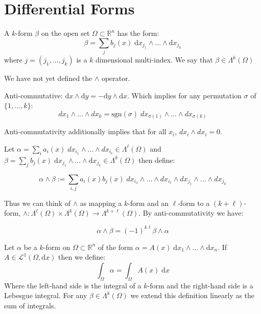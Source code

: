 \section{Differential Forms}

\begin{definition}
A $k$-form $\beta$ on the open set $\Omega \subset \mathbb{R}^n$ has the form:
\begin{equation}
\beta = \sum_j b_j(x) \; \text{d} x_{j_1} \wedge ... \wedge \text{d} x_{j_k}
\end{equation}
where $j=(j_1, ..., j_k)$ is a $k$ dimensional multi-index. We say that $\beta \in \Lambda^k(\Omega)$
\end{definition}

We have not yet defined the $\wedge$ operator.

Anti-commutative: $\text{d} x \wedge \text{d} y = - \text{d}y \wedge \text{d} x$. 
Which implies for any permutation $\sigma$ of $\{1,...,k\}$:
\begin{equation}
dx_1 \wedge ... \wedge dx_k = \text{sgn}(\sigma) \; dx_{\sigma(1)} \wedge ... \wedge dx_{\sigma(k)}
\end{equation}

Anti-commutativity additionally implies that for all $x_i$, $dx_i \wedge dx_i = 0$. 

Let $\alpha = \sum_i a_i(x) \; dx_{i_1} \wedge ... \wedge dx_{i_\ell} \in \Lambda^\ell(\Omega)$ and
$\beta = \sum_j b_j(x) \; \text{d} x_{j_1} \wedge ... \wedge \text{d} x_{j_k} \in \Lambda^k(\Omega)$ then define:

\begin{equation}
\alpha \wedge \beta  := \sum_{i,j} a_i(x) b_j(x) \; dx_{i_1} \wedge ... \wedge dx_{i_\ell} \wedge dx_{j_1} \wedge ... \wedge dx_{j_k}
\end{equation}

Thus we can think of $\wedge$ as mapping a $k$-form and an $\ell$-form to a $(k+\ell)$-form, $\wedge : \Lambda^\ell(\Omega) \times \Lambda^k (\Omega) \to \Lambda^{k+\ell} (\Omega)$. By anti-commutativity we have:

\begin{equation}
\alpha \wedge \beta = (-1)^{k \ell} \beta \wedge \alpha
\end{equation}


\begin{definition}
Let $\alpha$ be a $k$-form on $\Omega \subset \mathbb{R}^n$ of the form $\alpha = A(x) \; \text{d}x_1 \wedge ... \wedge \text{d} x_n$.
If $A \in \mathcal{L}^1 (\Omega , \text{d}x)$ then we define:
\begin{equation}
\int_\Omega \alpha = \int_\Omega A(x) \; \text{d}x
\end{equation}
Where the left-hand side is the integral of a $k$-form and the right-hand side is a Lebesgue integral.
For any $\beta \in \Lambda^k (\Omega)$ we extend this definition linearly as the sum of integrals.
\end{definition}

